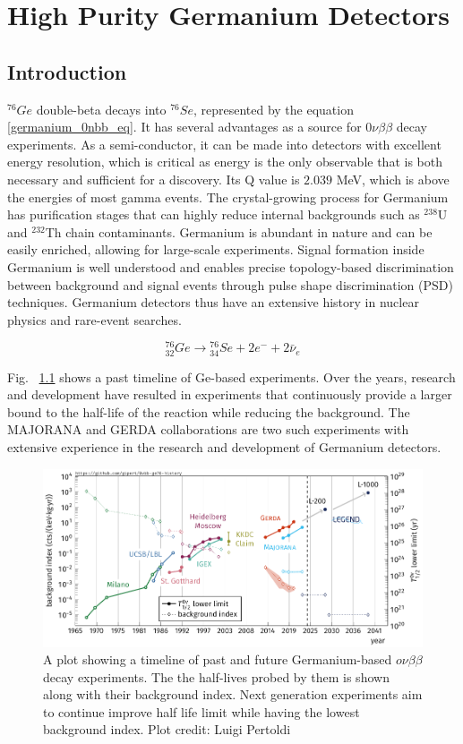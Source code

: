 \chapter{High Purity Germanium Detectors}
\label{chap:detectors}

\section{Introduction}
${}^{76}Ge$ double-beta decays into ${}^{76}Se$, represented by the equation \ref{germanium_0nbb_eq}. It has several advantages as a source for $0\nu\beta\beta$ decay experiments. As a semi-conductor, it can be made into detectors with excellent energy resolution, which is critical as energy is the only observable that is both necessary and sufficient for a discovery. Its Q value is $2.039$ MeV, which is above the energies of most gamma events. The crystal-growing process for Germanium has purification stages that can highly reduce internal backgrounds such as $^{238}$U and $^{232}$Th chain contaminants. Germanium is abundant in nature and can be easily enriched, allowing for large-scale experiments. Signal formation inside Germanium is well understood and enables precise topology-based discrimination between background and signal events through pulse shape discrimination (PSD) techniques. Germanium detectors thus have an extensive history in nuclear physics and rare-event searches.


\begin{equation}\label{germanium_0nbb_eq}
{}_{32}^{76}Ge \rightarrow {}_{34}^{76}Se + 2e^- + 2\bar{\nu}_e
\end{equation}

Fig. ~\ref{past_ge_exp} shows a past timeline of Ge-based experiments. Over the years, research and development have resulted in experiments that continuously provide a larger bound to the half-life of the reaction while reducing the background. The MAJORANA and GERDA collaborations are two such experiments with extensive experience in the research and development of Germanium detectors.

\begin{figure}[!htb]
\centering
\includegraphics[trim=0.1cm 0 0.1cm 0,clip, width=0.99\linewidth]{ch2/figs/0nbb-ge76-history-future.pdf}
\caption{A plot showing a timeline of past and future Germanium-based $o\nu\beta\beta$ decay experiments. The the half-lives probed by them is shown along with their background index. Next generation experiments aim to continue improve half life limit while having the lowest background index. Plot credit: Luigi Pertoldi}
\label{past_ge_exp}
\end{figure}


